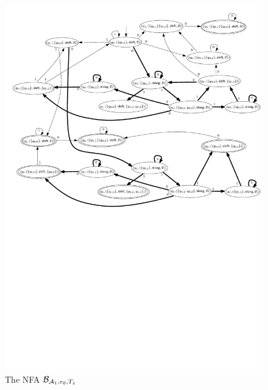 \begin{example}
\begin{figure}[htbp]
\begin{center}
			\includegraphics[scale=0.68]{regular-expression-example-2.pdf}
		\end{center}
		\caption{The NFA $\mathcal{B}_{\mathcal{A}_1, e_0, T_z}$}\label{fig-re-exmp}
	\end{figure} 
\end{example}

